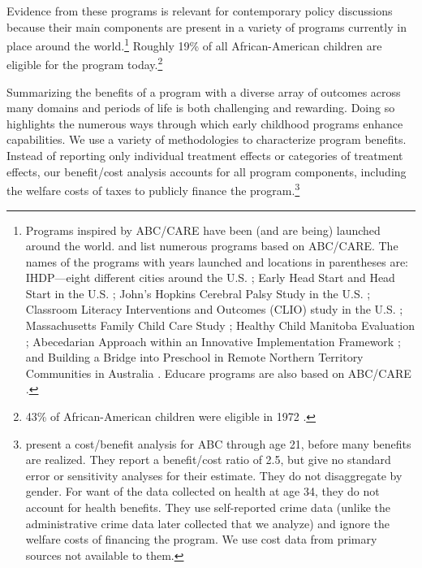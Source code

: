 Evidence from these programs is relevant for contemporary policy discussions because their main components are present in a variety of programs currently in place around the world.\footnote{Programs inspired by ABC/CARE have been (and are being) launched around the world. \citet{Sparling_2010_Highlights} and \citet{Ramey_Ramey_Lanzi_2014_Interventions} list numerous programs based on ABC/CARE. The names of the programs with years launched and locations in parentheses are: IHDP---eight different cities around the U.S. \citep{Spiker-etal_1997_Helping}; Early Head Start and Head Start in the U.S. \citep{Schneider_McDonald-eds_2007_Scale-Up_Vol-1}; John's Hopkins Cerebral Palsy Study in the U.S. \citep{Sparling_2010_Highlights}; Classroom Literacy Interventions and Outcomes (CLIO) study in the U.S. \citep{Sparling_2010_Highlights}; Massachusetts Family Child Care Study \citep{Collins_etal_2010_Massachusetts-Study}; Healthy Child Manitoba Evaluation \citep{Healthy_Child_Manitoba_2015_Starting-Early}; Abecedarian Approach within an Innovative Implementation Framework \citep{Jensen_Nielsen_2016_ABC-Programme-Pilot}; and Building a Bridge into Preschool in Remote Northern Territory Communities in Australia \citep{UMonash_Dataset_2015_URL}. Educare programs are also based on ABC/CARE \citep{Educare_2014_Research_Agenda,Yazejian_Bryant_2012_Educare}.} Roughly 19\% of all African-American children are eligible for the program today.\footnote{43\% of African-American children were eligible in 1972 \citep{Garcia_2016_National-Implementation-ECI}.}

Summarizing the benefits of a program with a diverse array of outcomes across many domains and periods of life is both challenging and rewarding. Doing so highlights the numerous ways through which early childhood programs enhance capabilities. We use a variety of methodologies to characterize program benefits. Instead of reporting only individual treatment effects or categories of treatment effects, our benefit/cost analysis accounts for all program components, including the welfare costs of taxes to publicly finance the program.\footnote{\cite{Barnett_Masse_2002_benefitcost,Barnett_Masse_2007_EER} present a cost/benefit analysis for ABC through age 21, before many benefits are realized. They report a benefit/cost ratio of 2.5, but give no standard error or sensitivity analyses for their estimate. They do not disaggregate by gender. For want of the data collected on health at age 34, they do not account for health benefits. They use self-reported crime data (unlike the administrative crime data later collected that we analyze) and ignore the welfare costs of financing the program. We use cost data from primary sources not available to them.}

